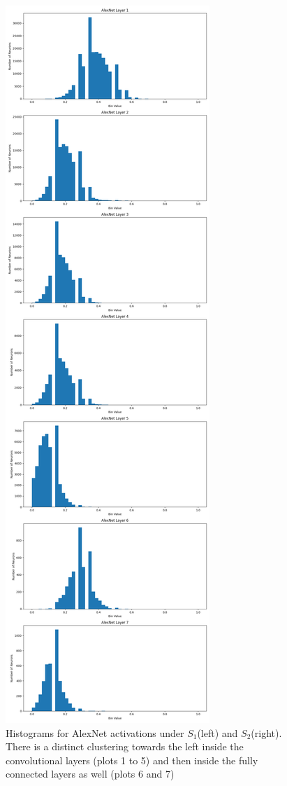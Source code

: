 \documentclass{article}
\begin{document}
\begin{figure}[H]
\begin{minipage}{0.45\textwidth}
            \end{minipage}\hfill
            \begin{minipage}{0.45\textwidth}
                \centering
                \includegraphics[width=\textwidth]{images/alexnet_class_frequency_list_threshold_n01601694.png} %
            \end{minipage}
            \caption{Histograms for AlexNet activations under $S_1$(left) and $S_2$(right). There is a distinct clustering towards the left inside the convolutional layers (plots 1 to 5) and then inside the fully connected layers as well (plots 6 and 7)}
            \label{fig:neuron_activation_frequency}
        \end{figure}
\end{document}
